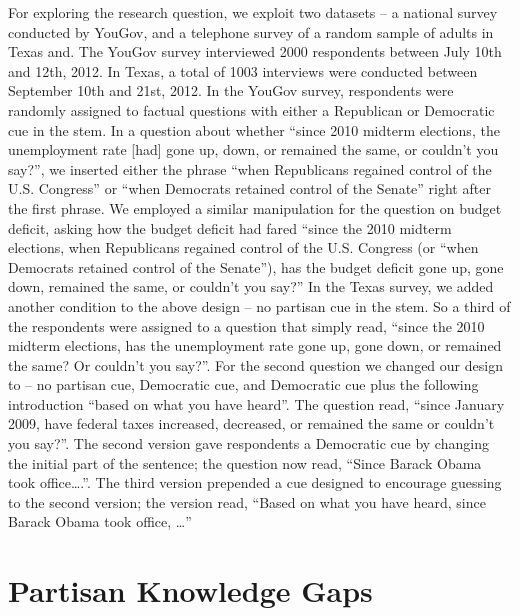 \documentclass[12pt, letterpaper]{article}
\begin{document}
For exploring the research question, we exploit two datasets – a national survey conducted by YouGov, and a telephone survey of a random sample of adults in Texas and. The YouGov survey interviewed 2000 respondents between July 10th and 12th, 2012.  In Texas, a total of 1003 interviews were conducted between September 10th and 21st, 2012. 
In the YouGov survey, respondents were randomly assigned to factual questions with either a Republican or Democratic cue in the stem. In a question about whether “since 2010 midterm elections, the unemployment rate [had] gone up, down, or remained the same, or couldn’t you say?”, we inserted either the phrase “when Republicans regained control of the U.S. Congress” or “when Democrats retained control of the Senate” right after the first phrase. We employed a similar manipulation for the question on budget deficit, asking how the budget deficit had fared “since the 2010 midterm elections, when Republicans regained control of the U.S. Congress (or “when Democrats retained control of the Senate”), has the budget deficit gone up, gone down, remained the same, or couldn’t you say?”
In the Texas survey, we added another condition to the above design – no partisan cue in the stem. So a third of the respondents were assigned to a question that simply read, “since the 2010 midterm elections, has the unemployment rate gone up, gone down, or remained the same?  Or couldn’t you say?”. For the second question we changed our design to – no partisan cue, Democratic cue, and Democratic cue plus the following introduction “based on what you have heard”. The question read, “since January 2009, have federal taxes increased, decreased, or remained the same or couldn’t you say?”. The second version gave respondents a Democratic cue by changing the initial part of the sentence; the question now read, “Since Barack Obama took office….”.  The third version prepended a cue designed to encourage guessing to the second version; the version read, “Based on what you have heard, since Barack Obama took office, …”

\section*{Partisan Knowledge Gaps}
\end{document}

